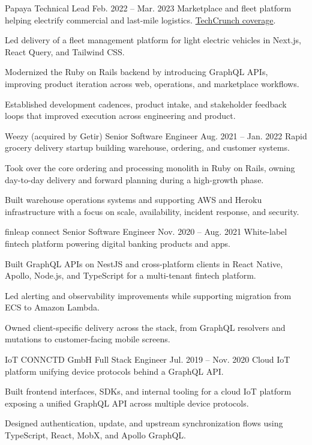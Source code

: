 \ResumeJob
  {Papaya}
  {Technical Lead}
  {Feb. 2022 -- Mar. 2023}
  {Marketplace and fleet platform helping electrify commercial and last-mile logistics. \href{https://techcrunch.com/2022/09/27/papaya-wants-to-help-electrify-last-mile-logistics-in-europe/}{TechCrunch coverage}.}
\begin{ResumeList}
  \item Led delivery of a fleet management platform for light electric vehicles in Next.js, React Query, and Tailwind CSS.
  \item Modernized the Ruby on Rails backend by introducing GraphQL APIs, improving product iteration across web, operations, and marketplace workflows.
  \item Established development cadences, product intake, and stakeholder feedback loops that improved execution across engineering and product.
\end{ResumeList}

\ResumeJob
  {Weezy (acquired by Getir)}
  {Senior Software Engineer}
  {Aug. 2021 -- Jan. 2022}
  {Rapid grocery delivery startup building warehouse, ordering, and customer systems.}
\begin{ResumeList}
  \item Took over the core ordering and processing monolith in Ruby on Rails, owning day-to-day delivery and forward planning during a high-growth phase.
  \item Built warehouse operations systems and supporting AWS and Heroku infrastructure with a focus on scale, availability, incident response, and security.
\end{ResumeList}

\ResumeJob
  {finleap connect}
  {Senior Software Engineer}
  {Nov. 2020 -- Aug. 2021}
  {White-label fintech platform powering digital banking products and apps.}
\begin{ResumeList}
  \item Built GraphQL APIs on NestJS and cross-platform clients in React Native, Apollo, Node.js, and TypeScript for a multi-tenant fintech platform.
  \item Led alerting and observability improvements while supporting migration from ECS to Amazon Lambda.
  \item Owned client-specific delivery across the stack, from GraphQL resolvers and mutations to customer-facing mobile screens.
\end{ResumeList}

\ResumeJob
  {IoT CONNCTD GmbH}
  {Full Stack Engineer}
  {Jul. 2019 -- Nov. 2020}
  {Cloud IoT platform unifying device protocols behind a GraphQL API.}
\begin{ResumeList}
  \item Built frontend interfaces, SDKs, and internal tooling for a cloud IoT platform exposing a unified GraphQL API across multiple device protocols.
  \item Designed authentication, update, and upstream synchronization flows using TypeScript, React, MobX, and Apollo GraphQL.
\end{ResumeList}

